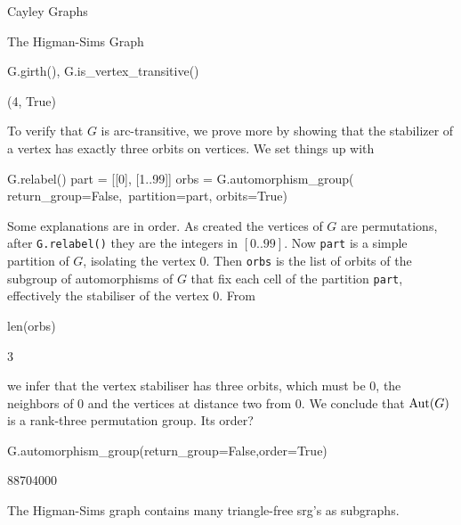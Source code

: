 \begin{chap}{Cayley Graphs}
\begin{sect}{The Higman-Sims Graph}
\begin{sagecode}
\begin{sageinput}
G.girth(), G.is_vertex_transitive()
\end{sageinput}
\begin{sageoutput}
(4, True)
\end{sageoutput}
\end{sagecode}
%
\begin{para}
To verify that $G$ is arc-transitive, we prove more by showing
that the stabilizer of a vertex has exactly three orbits on vertices.
We set things up with
\end{para}
%
\begin{sagecode}
\begin{sageinput}
G.relabel()
part = [[0], [1..99]]
orbs = G.automorphism_group( return_group=False,\
    partition=part, orbits=True)
\end{sageinput}
\end{sagecode}
%
\begin{para}
Some explanations are in order. As created the vertices of $G$ are permutations,
after \verb|G.relabel()| they are the integers in $[0..99]$. Now
\verb|part| is a simple partition of $G$, isolating the vertex $0$.  Then 
\verb|orbs| is the list of orbits of the subgroup of automorphisms of $G$
that fix each cell of the partition \texttt{part}, effectively the 
stabiliser of the vertex $0$. From
\end{para}
%
\begin{sagecode}
\begin{sageinput}
len(orbs)
\end{sageinput}
\begin{sageoutput}
3
\end{sageoutput}
\end{sagecode}
%
\begin{para}
we infer that the vertex stabiliser has three orbits, which must be 0,
the neighbors of 0 and the vertices at distance two from 0. We conclude
that $\mathrm{Aut}(G)$ is a rank-three permutation group. Its order?
\end{para}
%
\begin{sagecode}
\begin{sageinput}
G.automorphism_group(return_group=False,order=True)
\end{sageinput}
\begin{sageoutput}
88704000
\end{sageoutput}
\end{sagecode}
%
\begin{para}
The Higman-Sims graph contains many triangle-free srg's as subgraphs.

\end{para}
\end{sect}
\end{chap}
